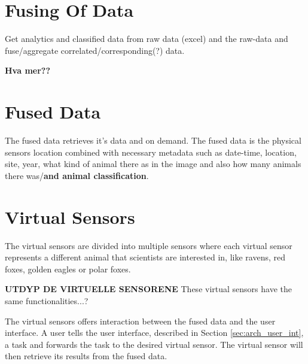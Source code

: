 \documentclass[USenglish]{uit-thesis}
\begin{document}
\section{Fusing Of Data}%
Get analytics and classified data from raw data (excel) and the raw-data and fuse/aggregate correlated/corresponding(?) data.

\textbf{Hva mer??}

\section{Fused Data}%
The fused data retrieves it's data and on demand. The fused data is the physical sensors location combined with necessary metadata such as date-time, location, site, year, what kind of animal there as in the image and also how many animals there was/\textbf{and animal classification}.


\section{Virtual Sensors} \label{sec:arch_vs}
The virtual sensors are divided into multiple sensors where each virtual sensor represents a different animal that scientists are interested in, like ravens, red foxes, golden eagles or polar foxes.

\textbf{UTDYP DE VIRTUELLE SENSORENE} 
These virtual sensors have the same functionalities...?

The virtual sensors offers interaction between the fused data and the user interface. A user tells the user interface, described in Section \ref{sec:arch_user_int}, a task and forwards the task to the desired virtual sensor. The virtual sensor will then retrieve its results from the fused data.


\end{document}
